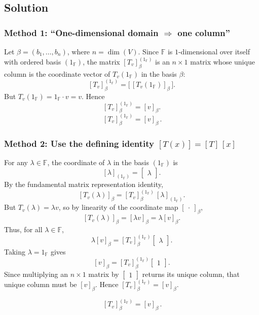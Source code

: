 \documentclass[12pt]{article}
\newcommand{\F}{\mathbb{F}}
\begin{document}
\subsection{Solution}

\subsubsection{Method 1: ``One-dimensional domain $\Rightarrow$ one column''}
Let $\beta=(b_1,\dots,b_n)$, where $n=\dim(V)$. Since $\F$ is $1$-dimensional over itself with ordered basis $(1_{\F})$,
the matrix $[T_v]_{\beta}^{(1_{\F})}$ is an $n\times 1$ matrix whose unique column is the coordinate vector of
$T_v(1_{\F})$ in the basis $\beta$:
\[
[T_v]_{\beta}^{(1_{\F})}
=
\bigl[\, [T_v(1_{\F})]_{\beta}\,\bigr].
\]
But $T_v(1_{\F}) = 1_{\F}\cdot v=v$. Hence
\[
[T_v]_{\beta}^{(1_{\F})} = [v]_{\beta}.
\]
\[
\boxed{\, [T_v]_{\beta}^{(1_{\F})} = [v]_{\beta}\, }.
\]

\newpage
\subsubsection{Method 2: Use the defining identity $[T(x)] = [T]\,[x]$}
For any $\lambda\in\F$, the coordinate of $\lambda$ in the basis $(1_{\F})$ is
\[
[\lambda]_{(1_{\F})}=\begin{bmatrix}\lambda\end{bmatrix}.
\]
By the fundamental matrix representation identity,
\[
[T_v(\lambda)]_{\beta} = [T_v]_{\beta}^{(1_{\F})}\,[\lambda]_{(1_{\F})}.
\]
But $T_v(\lambda)=\lambda v$, so by linearity of the coordinate map $[\ \cdot\ ]_{\beta}$,
\[
[T_v(\lambda)]_{\beta} = [\lambda v]_{\beta}=\lambda [v]_{\beta}.
\]
Thus, for all $\lambda\in\F$,
\[
\lambda [v]_{\beta}
=
[T_v]_{\beta}^{(1_{\F})}\begin{bmatrix}\lambda\end{bmatrix}.
\]
Taking $\lambda=1_{\F}$ gives
\[
[v]_{\beta}=[T_v]_{\beta}^{(1_{\F})}\begin{bmatrix}1\end{bmatrix}.
\]
Since multiplying an $n\times 1$ matrix by $\begin{bmatrix}1\end{bmatrix}$ returns its unique column, that unique column must be $[v]_{\beta}$.
Hence $[T_v]_{\beta}^{(1_{\F})}=[v]_{\beta}$.

\[
\boxed{\, [T_v]_{\beta}^{(1_{\F})} = [v]_{\beta}\, }.
\]

\newpage
\end{document}
